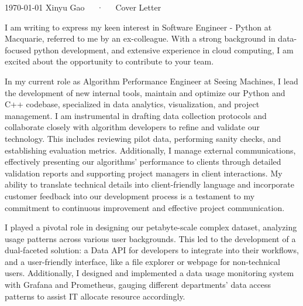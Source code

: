 \documentclass[11pt, a4paper]{awesome-cv}
\begin{document}
\makecvheader[C]

\makecvfooter
  {\today}
  {Xinyu Gao~~~·~~~Cover Letter}
  {}

\makelettertitle

\begin{cvletter}

I am writing to express my keen interest in Software Engineer - Python at Macquarie, referred to me by an ex-colleague. With a strong background in data-focused python development, and extensive experience in cloud computing, I am excited about the opportunity to contribute to your team.

In my current role as Algorithm Performance Engineer at Seeing Machines, I lead the development of new internal tools, maintain and optimize our Python and C++ codebase, specialized in data analytics, visualization, and project management. I am instrumental in drafting data collection protocols and collaborate closely with algorithm developers to refine and validate our technology. This includes reviewing pilot data, performing sanity checks, and establishing evaluation metrics. Additionally, I manage external communications, effectively presenting our algorithms' performance to clients through detailed validation reports and supporting project managers in client interactions. My ability to translate technical details into client-friendly language and incorporate customer feedback into our development process is a testament to my commitment to continuous improvement and effective project communication.

I played a pivotal role in designing our petabyte-scale complex dataset, analyzing usage patterns across various user backgrounds. This led to the development of a dual-faceted solution: a Data API for developers to integrate into their workflows, and a user-friendly interface, like a file explorer or webpage for non-technical users. Additionally, I designed and implemented a data usage monitoring system with Grafana and Prometheus, gauging different departments' data access patterns to assist IT allocate resource accordingly.


\end{cvletter}
\end{document}

